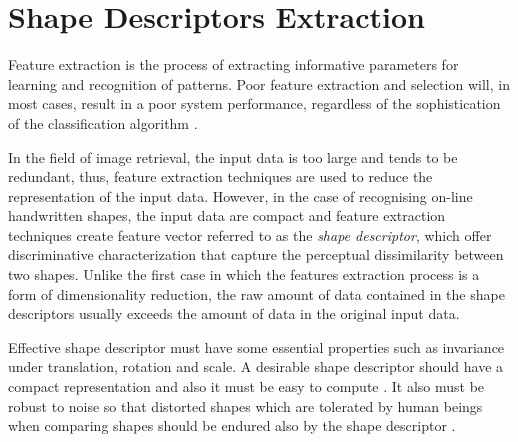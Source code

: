 
\newpage{}

\section{Shape Descriptors Extraction}
\label{sec:feature_extraction}
\iftoggle{edit-mode}{\hspace{0pt}\marginpar{Feature extraction}}{}
Feature extraction is the process of extracting informative parameters for learning and recognition of patterns. 
Poor feature extraction and selection will, in most cases, result in a poor system performance, regardless of the sophistication of the classification algorithm \cite{parizeau2001character}.

In the field of image retrieval, the input data is too large and tends to be redundant, thus, feature extraction techniques are used to reduce the representation of the input data. 
However, in the case of recognising on-line handwritten shapes, the input data are compact and feature extraction techniques create feature vector referred to as the \emph{shape descriptor}, which offer discriminative characterization that capture the perceptual dissimilarity between two shapes. 
Unlike the first case in which the features extraction process is a form of dimensionality reduction, the raw amount of data contained in the shape descriptors usually exceeds the amount of data in the original input data.

\iftoggle{edit-mode}{\hspace{0pt}\marginpar{Shape Descriptors}}{}
Effective shape descriptor must have some essential properties such as invariance under translation, rotation and scale. 
A desirable shape descriptor should have a compact representation and also it must be easy to compute \cite{zhang2004review}.
It also must be robust to noise so that distorted shapes which are tolerated by human beings when comparing shapes should be endured also by the shape descriptor \cite{zhang2004review, kim2000region}.

